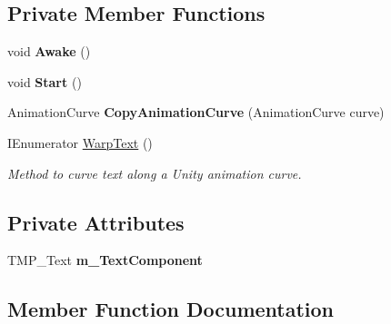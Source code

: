 \subsection*{Private Member Functions}
\begin{DoxyCompactItemize}
\item 
\mbox{\label{class_t_m_pro_1_1_examples_1_1_warp_text_example_a27ab4bde9d74741085a42c2360c37f1e}} 
void {\bfseries Awake} ()
\item 
\mbox{\label{class_t_m_pro_1_1_examples_1_1_warp_text_example_acdd83c2d233bf73c9c6da7ee51b1bc3c}} 
void {\bfseries Start} ()
\item 
\mbox{\label{class_t_m_pro_1_1_examples_1_1_warp_text_example_ad1b1c7fe6b7e59498268a47006da09a8}} 
Animation\+Curve {\bfseries Copy\+Animation\+Curve} (Animation\+Curve curve)
\item 
I\+Enumerator \hyperlink{class_t_m_pro_1_1_examples_1_1_warp_text_example_aefa5d7333e89c48b4f6df00d61d6e1c4}{Warp\+Text} ()
\begin{DoxyCompactList}\small\item\em Method to curve text along a Unity animation curve. \end{DoxyCompactList}\end{DoxyCompactItemize}
\subsection*{Private Attributes}
\begin{DoxyCompactItemize}
\item 
\mbox{\label{class_t_m_pro_1_1_examples_1_1_warp_text_example_a31c953d43370a467cf9d3309623d3887}} 
T\+M\+P\+\_\+\+Text {\bfseries m\+\_\+\+Text\+Component}
\end{DoxyCompactItemize}


\subsection{Member Function Documentation}
\mbox{\label{class_t_m_pro_1_1_examples_1_1_warp_text_example_aefa5d7333e89c48b4f6df00d61d6e1c4}} 
